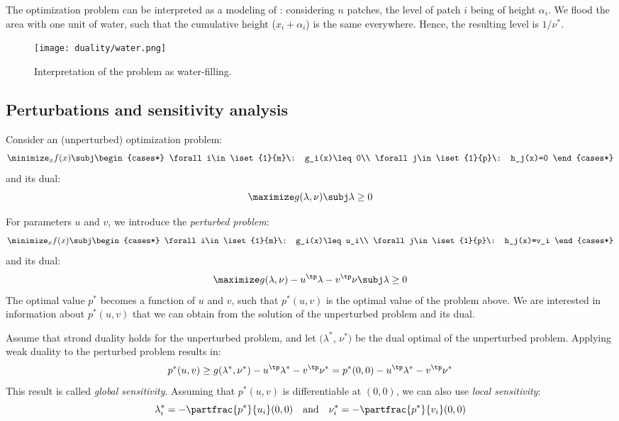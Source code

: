 The optimization problem can be interpreted as a modeling of : considering $n$ patches, the level of patch $i$ being of height $\alpha_i$. We flood the area with one unit of water, such that the cumulative height ($x_i+\alpha_i$) is the same everywhere. Hence, the resulting level is $1/\nu^*$.
\begin{figure}[H]
    \centering
    \texttt{[image: duality/water.png]}
    \caption{Interpretation of the problem as water-filling.}
\end{figure}

\subsection{Perturbations and sensitivity analysis}
Consider an (unperturbed) optimization problem:
\begin{equation*}
    \minimize_x f(x) \subj \begin{cases*}
        \forall i\in\iset{1}{m}\: g_i(x)\leq0\\
        \forall j\in\iset{1}{p}\: h_j(x)=0
    \end{cases*}
\end{equation*}
and its dual:
\begin{equation*}
    \maximize g(\lambda, \nu) \subj \lambda\geq0
\end{equation*}

For parameters $u$ and $v$, we introduce the \emph{perturbed problem}:
\begin{equation*}
    \minimize_x f(x) \subj \begin{cases*}
        \forall i\in\iset{1}{m}\: g_i(x)\leq u_i\\
        \forall j\in\iset{1}{p}\: h_j(x)=v_i
    \end{cases*}
\end{equation*}
and its dual:
\begin{equation*}
    \maximize g(\lambda, \nu) - u^\tp\lambda-v^\tp\nu \subj \lambda\geq0
\end{equation*}
The optimal value $p^*$ becomes a function of $u$ and $v$, such that $p^*(u,v)$ is the optimal value of the problem above. We are interested in information about $p^*(u,v)$ that we can obtain from the solution of the unperturbed problem and its dual.

Assume that strond duality holds for the unperturbed problem, and let $(\lambda^*$, $\nu^*)$ be the dual optimal of the unperturbed problem. Applying weak duality to the perturbed problem results in:
\begin{equation*}
    p^*(u, v) \geq g(\lambda^*,\nu^*) - u^\tp\lambda^*-v^\tp\nu^* = p^*(0,0)-u^\tp\lambda^*-v^\tp\nu^*
\end{equation*}
This result is called \emph{global sensitivity}. Assuming that $p^*(u,v)$ is differentiable at $(0,0)$, we can also use \emph{local sensitivity}:
\begin{equation*}
    \lambda_i^* = -\partfrac{p^*}{u_i}(0,0) \quad\text{and}\quad \nu_i^* = -\partfrac{p^*}{v_i}(0,0)
\end{equation*}


